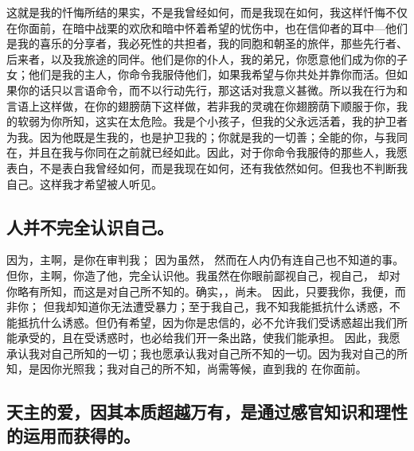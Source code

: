这就是我的忏悔所结的果实，不是我曾经如何，而是我现在如何，我这样忏悔不仅在你面前，在暗中战栗的欢欣和暗中怀着希望的忧伤中，也在信仰者的耳中---他们是我的喜乐的分享者，我必死性的共担者，我的同胞和朝圣的旅伴，那些先行者、后来者，以及我旅途的同伴。他们是你的仆人，我的弟兄，你愿意他们成为你的子女；他们是我的主人，你命令我服侍他们，如果我希望与你共处并靠你而活。但如果你的话只以言语命令，而不以行动先行，那这话对我意义甚微。所以我在行为和言语上这样做，在你的翅膀荫下这样做，若非我的灵魂在你翅膀荫下顺服于你，我的软弱为你所知，这实在太危险。我是个小孩子，但我的父永远活着，我的护卫者为我。因为他既是生我的，也是护卫我的；你就是我的一切善；全能的你，与我同在，并且在我与你同在之前就已经如此。因此，对于你命令我服侍的那些人，我愿表白，不是表白我曾经如何，而是我现在如何，还有我依然如何。但我也不判断我自己。这样我才希望被人听见。\par


\subsection{人并不完全认识自己。}

因为，主啊，是你在审判我； 因为虽然， 然而在人内仍有连自己也不知道的事。但你，主啊，你造了他，完全认识他。我虽然在你眼前鄙视自己，视自己， 却对你略有所知，而这是对自己所不知的。确实，，尚未。 因此，只要我你，我便，而非你； 但我却知道你无法遭受暴力；至于我自己，我不知我能抵抗什么诱惑，不能抵抗什么诱惑。但仍有希望，因为你是忠信的，必不允许我们受诱惑超出我们所能承受的，且在受诱惑时，也必给我们开一条出路，使我们能承担。 因此，我愿承认我对自己所知的一切；我也愿承认我对自己所不知的一切。因为我对自己的所知，是因你光照我；我对自己的所不知，尚需等候，直到我的  在你面前。\par


\subsection{天主的爱，因其本质超越万有，是通过感官知识和理性的运用而获得的。}

